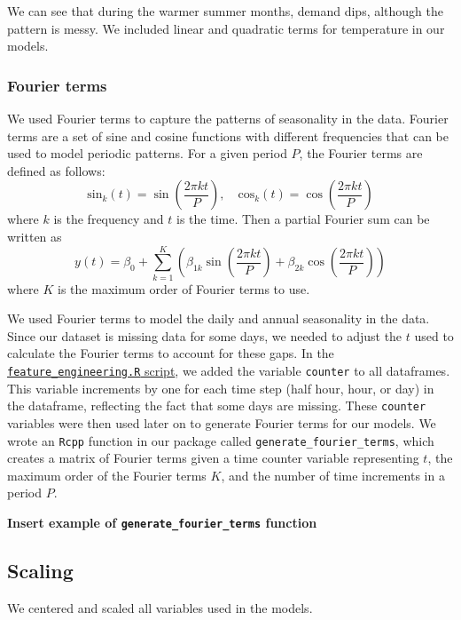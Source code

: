 \documentclass[
]{article}
\begin{document}
We can see that during the warmer summer months, demand dips, although
the pattern is messy. We included linear and quadratic terms for
temperature in our models.

\hypertarget{fourier-terms}{%
\subsubsection{Fourier terms}\label{fourier-terms}}

We used Fourier terms to capture the patterns of seasonality in the
data. Fourier terms are a set of sine and cosine functions with
different frequencies that can be used to model periodic patterns. For a
given period \(P\), the Fourier terms are defined as follows:
\[\text{sin}_k(t) = \sin\left(\frac{2\pi kt}{P}\right), \quad \text{cos}_k(t) = \cos\left(\frac{2\pi kt}{P}\right)\]
where \(k\) is the frequency and \(t\) is the time. Then a partial
Fourier sum can be written as
\[ y(t) = \beta_0 + \sum_{k=1}^{K} \left( \beta_{1k} \sin\left(\frac{2\pi kt}{P}\right) + \beta_{2k} \cos\left(\frac{2\pi kt}{P}\right) \right) \]
where \(K\) is the maximum order of Fourier terms to use.

We used Fourier terms to model the daily and annual seasonality in the
data. Since our dataset is missing data for some days, we needed to
adjust the \(t\) used to calculate the Fourier terms to account for
these gaps. In the
\href{https://github.com/Shermjj/SC-2-Electric-Boogalo/blob/main/feature_engineering.R}{\texttt{feature\_engineering.R}
script}, we added the variable \texttt{counter} to all dataframes. This
variable increments by one for each time step (half hour, hour, or day)
in the dataframe, reflecting the fact that some days are missing. These
\texttt{counter} variables were then used later on to generate Fourier
terms for our models. We wrote an \texttt{Rcpp} function in our package
called \texttt{generate\_fourier\_terms}, which creates a matrix of
Fourier terms given a time counter variable representing \(t\), the
maximum order of the Fourier terms \(K\), and the number of time
increments in a period \(P\).

\textbf{Insert example of \texttt{generate\_fourier\_terms} function}

\hypertarget{scaling}{%
\subsection{Scaling}\label{scaling}}

We centered and scaled all variables used in the models.
\end{document}
